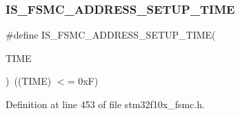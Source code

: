 \subsubsection{\texorpdfstring{I\+S\+\_\+\+F\+S\+M\+C\+\_\+\+A\+D\+D\+R\+E\+S\+S\+\_\+\+S\+E\+T\+U\+P\+\_\+\+T\+I\+ME}{IS\_FSMC\_ADDRESS\_SETUP\_TIME}}
{\footnotesize\ttfamily \#define I\+S\+\_\+\+F\+S\+M\+C\+\_\+\+A\+D\+D\+R\+E\+S\+S\+\_\+\+S\+E\+T\+U\+P\+\_\+\+T\+I\+ME(\begin{DoxyParamCaption}\item[{}]{T\+I\+ME }\end{DoxyParamCaption})~((T\+I\+ME) $<$= 0x\+F)}



Definition at line 453 of file stm32f10x\+\_\+fsmc.\+h.


